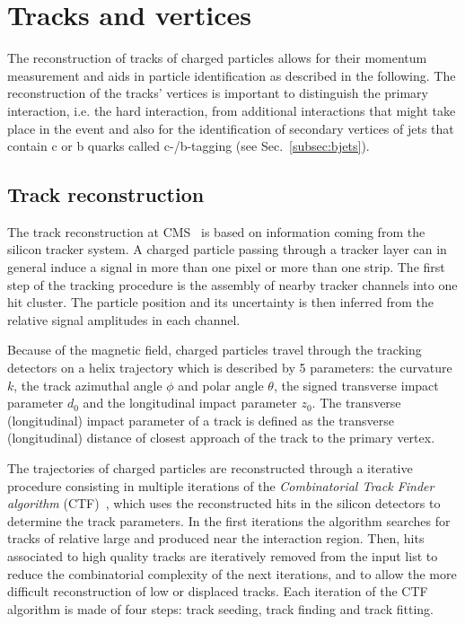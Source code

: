 \section{Tracks and vertices}\label{sec:tracksandvtx}

The reconstruction of tracks of charged particles allows for their momentum measurement and aids in particle identification as described in the following. The reconstruction of the tracks' vertices is important to distinguish the primary interaction, i.e. the hard interaction, from additional interactions that might take place in the event and also for the identification of secondary vertices of jets that contain c or b quarks called c-/b-tagging (see Sec.~\ref{subsec:bjets}).

\subsection{Track reconstruction}\label{subsec:tracks}

The track reconstruction at CMS~\cite{Chatrchyan:2014fea} is based on information coming from the silicon tracker system. A charged particle passing through a tracker layer can in general induce a signal in more than one pixel or more than one strip. The first step of the tracking procedure is the assembly of nearby tracker channels into one hit cluster. The particle position and its uncertainty is then inferred from the relative signal amplitudes in each channel.

Because of the magnetic field, charged particles travel through the tracking detectors on a helix trajectory which is described by 5 parameters: the curvature $k$, the track azimuthal angle $\phi$ and polar angle $\theta$, the signed transverse impact parameter $d_0$ and the longitudinal impact parameter $z_0$. The transverse (longitudinal) impact parameter of a track is defined as the transverse (longitudinal) distance of closest approach of the track to the primary vertex.

The trajectories of charged particles are reconstructed through a iterative procedure consisting in multiple iterations of the \textit{Combinatorial Track Finder algorithm} (CTF)~\cite{Adam:934067}, which uses the reconstructed hits in the silicon detectors to determine the track parameters. In the first iterations the algorithm searches for tracks of relative large \pt and produced near the interaction region. Then, hits associated to high quality tracks are iteratively removed from the input list to reduce the combinatorial complexity of the next iterations, and to allow the more difficult reconstruction of low \pt or displaced tracks. Each iteration of the CTF algorithm is made of four steps: track seeding, track finding and track fitting.

